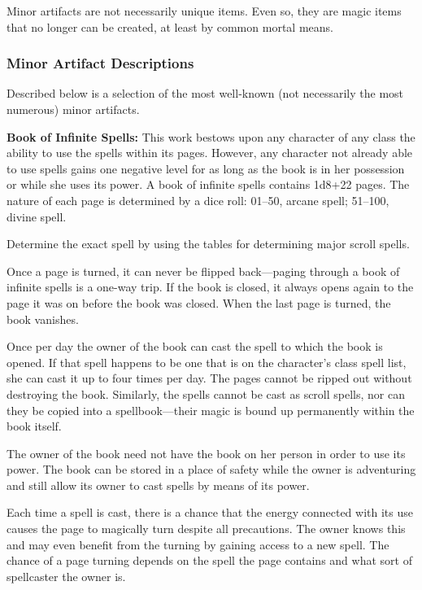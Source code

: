 Minor artifacts are not necessarily unique items. Even so, they are magic items that no longer can be created, at least by common mortal means.

\subsubsection{Minor Artifact Descriptions}
Described below is a selection of the most well-known (not necessarily the most numerous) minor artifacts.

\textbf{Book of Infinite Spells:} This work bestows upon any character of any class the ability to use the spells within its pages. However, any character not already able to use spells gains one negative level for as long as the book is in her possession or while she uses its power. A book of infinite spells contains 1d8+22 pages. The nature of each page is determined by a dice roll: 01--50, arcane spell; 51--100, divine spell.

Determine the exact spell by using the tables for determining major scroll spells.

Once a page is turned, it can never be flipped back---paging through a book of infinite spells is a one-way trip. If the book is closed, it always opens again to the page it was on before the book was closed. When the last page is turned, the book vanishes.

Once per day the owner of the book can cast the spell to which the book is opened. If that spell happens to be one that is on the character's class spell list, she can cast it up to four times per day. The pages cannot be ripped out without destroying the book. Similarly, the spells cannot be cast as scroll spells, nor can they be copied into a spellbook---their magic is bound up permanently within the book itself.

The owner of the book need not have the book on her person in order to use its power. The book can be stored in a place of safety while the owner is adventuring and still allow its owner to cast spells by means of its power.

Each time a spell is cast, there is a chance that the energy connected with its use causes the page to magically turn despite all precautions. The owner knows this and may even benefit from the turning by gaining access to a new spell. The chance of a page turning depends on the spell the page contains and what sort of spellcaster the owner is.


